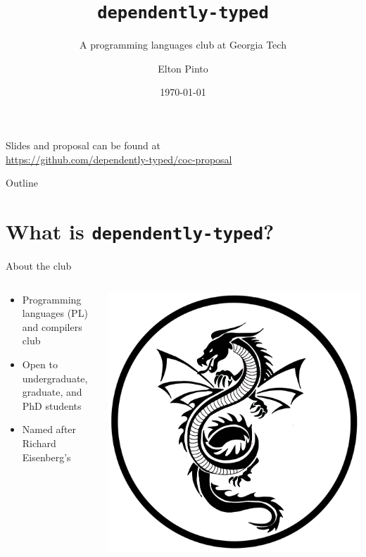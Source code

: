 \documentclass{beamer}
\title{\texttt{dependently-typed}}
\subtitle{A programming languages club at Georgia Tech}
\author{Elton Pinto}
\date{\today}
\begin{document}
\begin{frame}
  \titlepage
\end{frame}

\begin{frame}
  \begin{center}
    Slides and proposal can be found at \\ \small\url{https://github.com/dependently-typed/coc-proposal}
  \end{center}
\end{frame}

\begin{frame}{Outline}
  \tableofcontents[hideallsubsections]
\end{frame}

\section{What is \texttt{dependently-typed}?}

\begin{frame}{About the club}
  \begin{columns}
    \begin{column}{0.8\textwidth}
      \begin{itemize}
      \item Programming languages (PL) and compilers club
      \item Open to undergraduate, graduate, and PhD students
      \item Named after Richard Eisenberg's  \cite{eisenberg2016dependent}
      \end{itemize}
    \end{column}

    \begin{column}{0.15\textwidth}
      \centering
      \includegraphics[width=\textwidth]{assets/dragon.png}
    \end{column}
  \end{columns}
\end{frame}
\end{document}
